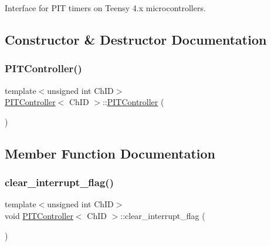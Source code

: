 Interface for P\+IT timers on Teensy 4.\+x microcontrollers. 

\subsection{Constructor \& Destructor Documentation}
\mbox{\label{classPITController_ad9ef4f151495076fad7b0c556e48b117}} 
\subsubsection{\texorpdfstring{P\+I\+T\+Controller()}{PITController()}}
{\footnotesize\ttfamily template$<$unsigned int Ch\+ID$>$ \\
\hyperlink{classPITController}{P\+I\+T\+Controller}$<$ Ch\+ID $>$\+::\hyperlink{classPITController}{P\+I\+T\+Controller} (\begin{DoxyParamCaption}{ }\end{DoxyParamCaption})\hspace{0.3cm}{\ttfamily [inline]}}



\subsection{Member Function Documentation}
\mbox{\label{classPITController_ae3f9c981e88cced34153234475de5646}} 
\subsubsection{\texorpdfstring{clear\+\_\+interrupt\+\_\+flag()}{clear\_interrupt\_flag()}}
{\footnotesize\ttfamily template$<$unsigned int Ch\+ID$>$ \\
void \hyperlink{classPITController}{P\+I\+T\+Controller}$<$ Ch\+ID $>$\+::clear\+\_\+interrupt\+\_\+flag (\begin{DoxyParamCaption}{ }\end{DoxyParamCaption})\hspace{0.3cm}{\ttfamily [inline]}}



